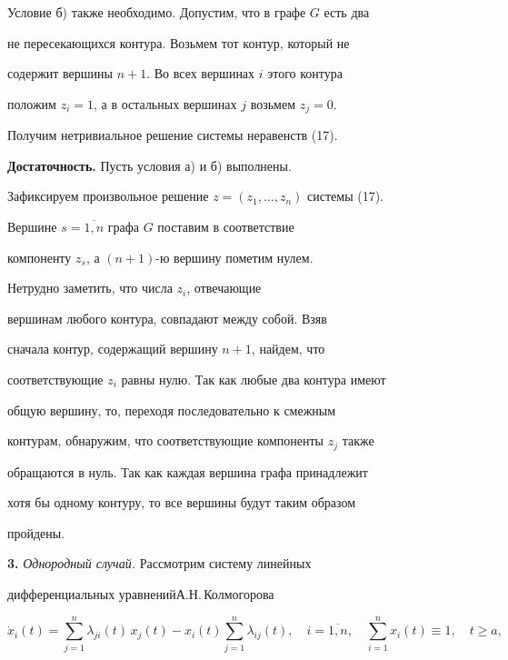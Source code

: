 \begin{pf}
Условие б) также необходимо. Допустим, что в графе $G$ есть два


не пересекающихся контура. Возьмем тот контур, который не


содержит вершины $n+1$. Во всех вершинах $i$ этого контура


положим $z_i=1$, а в остальных вершинах $j$ возьмем $z_j=0$.


Получим нетривиальное решение системы неравенств (17).


\medskip





{\bf Достаточность.} Пусть условия а) и б) выполнены.


Зафиксируем произвольное решение $z=(z_1,\dotsc,z_n)$ системы (17).


Вершине $s=\overline{1,n}$ графа $G$ поставим в соответствие


компоненту $z_s$, а $(n+1)$-ю вершину пометим нулем.


Нетрудно заметить, что числа $z_i$,  отвечающие


вершинам любого контура, совпадают между собой. Взяв


сначала контур, содержащий вершину $n+1$, найдем, что


соответствующие $z_i$ равны нулю. Так как любые два контура имеют


общую вершину, то, переходя последовательно к смежным


контурам, обнаружим, что соответствующие компоненты $z_j$ также


обращаются в нуль. Так как каждая вершина графа принадлежит


хотя бы одному контуру, то все вершины будут таким образом


пройдены.


\end{pf}





{\bf 3.} {\it Однородный случай.} Рассмотрим систему линейных


дифференциальных уравнений\linebreak А.Н.\,Колмогорова


\begin{equation}


\Dot x_i(t)=\sum_{j=1}^n\lambda_{ji}(t)\,x_j(t)-


x_i(t)\sum_{j=1}^n\lambda_{ij}(t),\quad i=\overline{1,n},\quad


\sum_{i=1}^nx_i(t)\equiv 1,\quad t\ge a, %


\end{equation}


